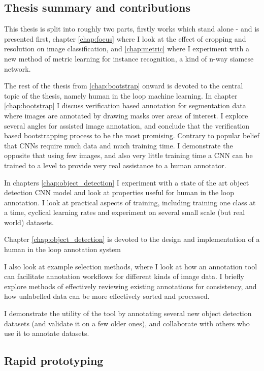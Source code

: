 \subsection {Thesis summary and contributions}

This thesis is split into roughly two parts, firstly works which stand alone - and is presented first, chapter \ref{chap:focus} where I look at the effect of cropping and resolution on image classification, and \ref{chap:metric} where I experiment with a new method of metric learning for instance recognition, a kind of n-way siamese network. 

The rest of the thesis from \ref{chap:bootstrap} onward is devoted to the central topic of the thesis, namely human in the loop machine learning. In chapter \ref{chap:bootstrap} I discuss verification based annotation for segmentation data where images are annotated by drawing masks over areas of interest. I explore several angles for assisted image annotation, and conclude that the verification based bootstrapping process to be the most promising. Contrary to popular belief that \gls{CNN}s require much data and much training time. I demonstrate the opposite that using few images, and also very little training time a \gls{CNN} can be trained to a level to provide very real assistance to a human annotator. 

In chapters \ref{chap:object_detection} I experiment with a state of the art object detection \gls{CNN} model and look at properties useful for human in the loop annotation. I look at practical aspects of training, including training one class at a time, cyclical learning rates and experiment on several small scale (but real world) datasets. 


Chapter \ref{chap:object_detection} is devoted to the design and implementation of a human in the loop annotation system 

I also look at example selection methods, where I look at how an annotation tool can facilitate annotation workflows for different kinds of image data. I briefly explore methods of effectively reviewing existing annotations for consistency, and how unlabelled data can be more effectively sorted and processed.

I demonstrate the utility of the tool by annotating several new object detection datasets (and validate it on a few older ones),  and collaborate with others who use it to annotate datasets.



\subsection {Rapid prototyping}

